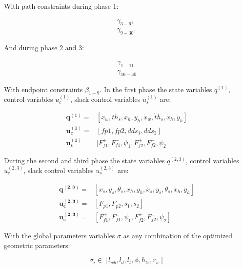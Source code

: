 \documentclass[default,iicol]{sn-jnl}
\begin{document}
With path constraints during phase 1:

\begin{equation}
    \begin{array}{c}
         \gamma_{3-6},  \\
         \gamma_{9-30},
    \end{array}
\end{equation}

And during phase 2 and 3:

\begin{equation}
    \begin{array}{c}
         \gamma_{1-11}  \\
         \gamma_{16-30}
    \end{array}
\end{equation}

With endpoint constraints $\beta_{1-9}$.
In the first phase the state variables $q^{(1)}$, control variables $u_c^{(1)}$, slack control variables $u_s^{(1)}$ are:

\begin{equation}
\begin{array}{rl}
   \mathbf{q^{(1)}} =& [x_w , th_s, x_h, y_h, \dot x_w, \dot th_s,\dot x_h, \dot y_h]    \\
   \mathbf{u_c^{(1)}} =& [fp1, fp2, dds_1, dds_2]  \\
   \mathbf{u_s^{(1)}}=&  [F_{f1}^+, F_{f1}^-, \psi_1,F_{f2}^+, F_{f2}^-, \psi_2 
\end{array}
\end{equation}

During the second and third phase the state variables $q^{(2,3)}$, control variables $u_c^{(2,3)}$, slack control variables $u_s^{(2,3)}$ are:

\begin{equation}
\begin{array}{rl}
   \mathbf{q^{(2,3)}} =& [x_s, y_s, \theta_s, x_h, y_h, \dot x_s, \dot y_s, \dot \theta_s,\dot x_h, \dot y_h]    \\
   \mathbf{u_c^{(2,3)}} =& [F_{p1}, F_{p2}, \ddot s_1, \ddot s_2]  \\
   \mathbf{u_s^{(2,3)}}=&  [F_{f1}^+, F_{f1}^-, \psi_1,F_{f2}^+, F_{f2}^-, \psi_2] 
\end{array}
\end{equation}

With the global parameters variables $\sigma$ as any combination of the optimized geometric parameters: 

\begin{equation}
    \sigma_i \in [l_{wb}, l_d, l_t, \phi, h_{tr}, r_w]
\end{equation}
\end{document}
